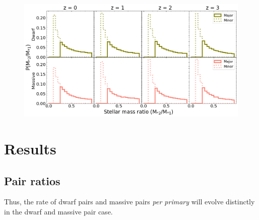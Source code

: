 \documentclass[twocolumn]{aastex631}
\begin{document}
  \begin{figure}[htb]
    \centering
    \includegraphics[width=\textwidth]{stellarmass_distribution.png}
    \caption{
      }
    \label{fig:massratio}
  \end{figure}






\section{Results}
\subsection{Pair ratios}
Thus, the rate of dwarf pairs and massive pairs \textit{per primary} will evolve distinctly in the dwarf and massive pair case.
\end{document}
